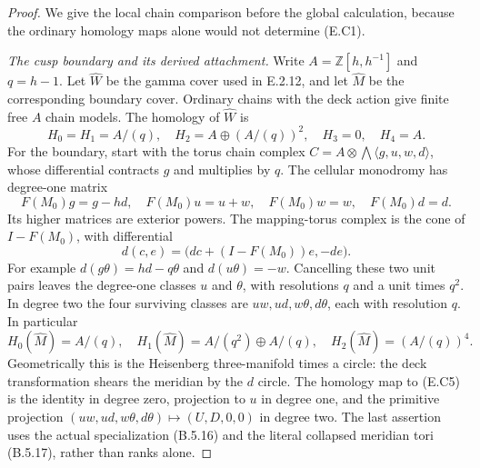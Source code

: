 \begin{proof}
We give the local chain comparison before the global
calculation, because the ordinary homology maps alone would
not determine (E.C1).

\emph{The cusp boundary and its derived attachment.}
Write $A=\mathbb Z[h,h^{-1}]$ and $q=h-1$. Let
$\widehat W$ be the gamma cover used in E.2.12, and let
$\widehat M$ be the corresponding boundary cover. Ordinary
chains with the deck action give finite free $A$ chain
models. The homology of $\widehat W$ is
\[
 H_0=H_1=A/(q),\quad H_2=A\oplus(A/(q))^2,
 \quad H_3=0,\quad H_4=A.
 \tag{E.C5}
\]
For the boundary, start with the torus chain complex
$C= A\otimes\bigwedge\langle g,u,w,d\rangle$,
whose differential contracts $g$ and multiplies by $q$.
The cellular monodromy has degree-one matrix
\[
 F(M_0)g=g-hd,\quad F(M_0)u=u+w,
 \quad F(M_0)w=w,\quad F(M_0)d=d.
 \tag{E.C6}
\]
Its higher matrices are exterior powers. The mapping-torus
complex is the cone of $I-F(M_0)$, with differential
\[
 d(c,e)=\big(dc+(I-F(M_0))e,-de\big).
 \tag{E.C7}
\]
For example $d(g\theta)=hd-q\theta$ and
$d(u\theta)=-w$. Cancelling these two unit pairs leaves
the degree-one classes $u$ and $\theta$, with resolutions
$q$ and a unit times $q^2$. In degree two the four surviving
classes are $uw,ud,w\theta,d\theta$, each with resolution
$q$. In particular
\[
 H_0(\widehat M)=A/(q),\quad
 H_1(\widehat M)=A/(q^2)\oplus A/(q),\quad
 H_2(\widehat M)=(A/(q))^4.
 \tag{E.C8}
\]
Geometrically this is the Heisenberg three-manifold times
a circle: the deck transformation shears the meridian
by the $d$ circle. The homology map to (E.C5) is the
identity in degree zero, projection to $u$ in degree one,
and the primitive projection
$(uw,ud,w\theta,d\theta)\mapsto(U,D,0,0)$ in degree two.
The last assertion uses the actual specialization
(B.5.16) and the literal collapsed meridian tori
(B.5.17), rather than ranks alone.


\end{proof}
